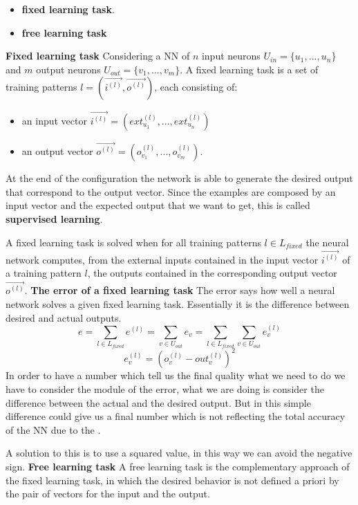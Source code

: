\documentclass{article}
\begin{document}
\begin{itemize}
    \item \textbf{fixed learning task}.
    \item \textbf{free learning task}
\end{itemize}
\pagebreak
\noindent\textbf{Fixed learning task}
\newline
\noindent Considering a NN of $n$ input neurons $U_{in}=\{u_1,...,u_n\}$ and $m$ output neurons
$U_{out}=\{v_1,...,v_m\}$. A fixed learning task is a set of training patterns
$l=(\vec{i^{(l)}}, \vec{o^{(l)}})$, each consisting of:
\begin{itemize}
    \item an input vector $\vec{i^{(l)}} =(ext_{u_1}^{(l)},...,ext_{u_n}^{(l)})$
    \item an output vector $\vec{o^{(l)}} =(o_{v_1}^{(l)},...,o_{v_m}^{(l)})$.
\end{itemize}
\noindent At the end of the configuration the network is able to generate the desired output
that correspond to the output vector. Since the examples are composed by an input
vector and the expected output that we want to get, this is called \textbf{supervised
    learning}.

A fixed learning task is solved when for all training patterns $l\in L_{fixed}$ the
neural network computes, from the external inputs contained in the input vector
$\vec{i^{(l)}}$ of a training pattern $l$, the outputs contained in the
corresponding output vector $\vec{o^{(l)}}$.
\newline
\newline
\noindent\textbf{The error of a fixed learning task}
\newline
The error says how well a neural network solves a given fixed learning task. Essentially
it is the difference between desired and actual outputs.
$$e=\sum_{l\in L_{fixed}}e^{(l)}=\sum_{v\in U_{out}}e_v=\sum_{l\in L_{fixed}} \sum_{v\in U_{out}}e_v^{(l)}$$
$$e_v^{(l)}=\left(o_v^{(l)}-out_v^{(l)}\right)^2$$
In order to have a number which tell us the final quality what we need to do we have
to consider the module of the error, what we are doing is consider the difference between
the actual and the desired output. But in this simple difference could give us a final
number which is not reflecting the total accuracy of the NN due to the .

A solution to this is to use a squared value, in this way we can avoid the negative
sign.
\newline\newline\noindent\textbf{Free learning task}\newline
A free learning task is the complementary approach of the fixed learning task, in
which the desired behavior is not defined a priori by the pair of vectors for
the input and the output.
\end{document}
